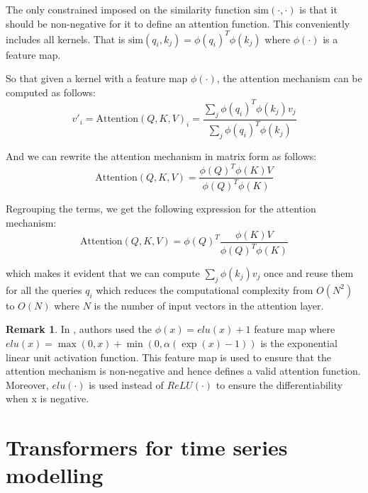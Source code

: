 \documentclass[a4paper, twoside]{report}
\theoremstyle{definition}
\newtheorem{remark}[theorem]{Remark}
\numberwithin{equation}{section}
\begin{document}
The only constrained imposed on the similarity function $\text{sim}(\cdot, \cdot)$ is that it should be non-negative for it to define an attention function.
This conveniently includes all kernels. That is $\text{sim}(q_i, k_j)=\phi(q_i)^T \phi(k_j)$ where $\phi(\cdot)$ is a feature map.

So that given a kernel with a feature map $\phi(\cdot)$, the attention mechanism can be computed as follows:
\begin{equation}
    v'_i=\text{Attention}(Q, K, V)_i=\frac{\sum_j \phi(q_i)^T \phi(k_j) v_j}{\sum_j \phi(q_i)^T \phi(k_j)}
\end{equation}

And we can rewrite the attention mechanism in matrix form as follows:
\begin{equation}
    \text{Attention}(Q, K, V)=\frac{\phi(Q)^T \phi(K) V}{\phi(Q)^T \phi(K)}
\end{equation}

Regrouping the terms, we get the following expression for the attention mechanism:
\begin{equation}
    \text{Attention}(Q, K, V)=\phi(Q)^T \frac{\phi(K) V}{\phi(Q)^T \phi(K)}
\end{equation}

which makes it evident that we can compute $\sum_j \phi(k_j) v_j$ once and reuse them for all the queries $q_i$
which reduces the computational complexity from $O(N^2)$ to $O(N)$ where $N$ is the number of input vectors
in the attention layer.

\begin{remark}
    In \cite{2006.16236}, authors used the $\phi(x)=elu(x)+1$ feature map where
    $elu(x)=\max(0, x)+\min(0, \alpha(\exp(x)-1))$ is the exponential linear unit activation function.
    This feature map is used to ensure that the attention mechanism is non-negative
    and hence defines a valid attention function. Moreover, $elu(\cdot)$ is used instead of $ReLU(\cdot)$
    to ensure the differentiability when x is negative.
\end{remark}

\section{Transformers for time series modelling}
\end{document}
